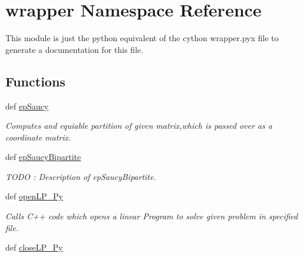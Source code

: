 \hypertarget{namespacewrapper}{\section{wrapper Namespace Reference}
\label{namespacewrapper}
}


This module is just the python equivalent of the cython wrapper.\-pyx file to generate a documentation for this file.  


\subsection*{Functions}
\begin{DoxyCompactItemize}
\item 
def \hyperlink{namespacewrapper_aee91f25e53bf05bae4d7aa26aa04830d}{ep\-Saucy}
\begin{DoxyCompactList}\small\item\em Computes and equiable partition of given matrix,which is passed over as a coordinate matrix. \end{DoxyCompactList}\item 
def \hyperlink{namespacewrapper_ab13b9edec3e484ab6965d696b28172e0}{ep\-Saucy\-Bipartite}
\begin{DoxyCompactList}\small\item\em T\-O\-D\-O \-: Description of ep\-Saucy\-Bipartite. \end{DoxyCompactList}\item 
def \hyperlink{namespacewrapper_acef89f01c3dc732a4493a8922cf07710}{open\-L\-P\-\_\-\-Py}
\begin{DoxyCompactList}\small\item\em Calls C++ code which opens a linear Program to solve given problem in specified file. \end{DoxyCompactList}\item 
\hypertarget{namespacewrapper_ae2781010cf84ee622287444bb452422c}{def \hyperlink{namespacewrapper_ae2781010cf84ee622287444bb452422c}{close\-L\-P\-\_\-\-Py}}\label{namespacewrapper_ae2781010cf84ee622287444bb452422c}


\end{DoxyCompactItemize}
